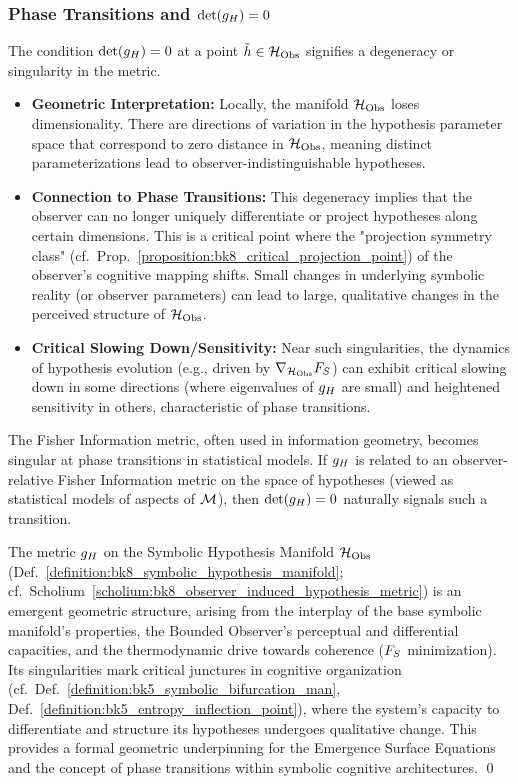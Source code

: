 \subsubsection{Phase Transitions and \(\det(g_H) = 0\)}
\label{subsec:bk8_phase_transitions}
The condition \(\det(g_H) = 0\) at a point \(\tilde{h} \in \mathcal{H}_{\mathrm{Obs}}\) signifies a degeneracy or singularity in the metric.
\begin{itemize}
    \item \textbf{Geometric Interpretation:} Locally, the manifold \(\mathcal{H}_{\mathrm{Obs}}\) loses dimensionality. There are directions of variation in the hypothesis parameter space that correspond to zero distance in \(\mathcal{H}_{\mathrm{Obs}}\), meaning distinct parameterizations lead to observer-indistinguishable hypotheses.
    \item \textbf{Connection to Phase Transitions:} This degeneracy implies that the observer can no longer uniquely differentiate or project hypotheses along certain dimensions. This is a critical point where the "projection symmetry class" (cf.~Prop.~\ref{proposition:bk8_critical_projection_point}) of the observer's cognitive mapping shifts. Small changes in underlying symbolic reality (or observer parameters) can lead to large, qualitative changes in the perceived structure of \(\mathcal{H}_{\mathrm{Obs}}\).
    \item \textbf{Critical Slowing Down/Sensitivity:} Near such singularities, the dynamics of hypothesis evolution (e.g., driven by \(\nabla_{\mathcal{H}_{\mathrm{Obs}}}F_S\)) can exhibit critical slowing down in some directions (where eigenvalues of \(g_H\) are small) and heightened sensitivity in others, characteristic of phase transitions.
\end{itemize}
The Fisher Information metric, often used in information geometry, becomes singular at phase transitions in statistical models. If \(g_H\) is related to an observer-relative Fisher Information metric on the space of hypotheses (viewed as statistical models of aspects of \(\mathcal{M}\)), then \(\det(g_H)=0\) naturally signals such a transition.
\begin{scholium}
\label{scholium:bk8_emergent_geometry_of_cognition}
The metric \(g_H\) on the Symbolic Hypothesis Manifold \(\mathcal{H}_{\mathrm{Obs}}\) (Def.~\ref{definition:bk8_symbolic_hypothesis_manifold}; cf.~Scholium~\ref{scholium:bk8_observer_induced_hypothesis_metric}) is an emergent geometric structure, arising from the interplay of the base symbolic manifold's properties, the Bounded Observer's perceptual and differential capacities, and the thermodynamic drive towards coherence (\(F_S\) minimization). Its singularities mark critical junctures in cognitive organization (cf.~Def.~\ref{definition:bk5_symbolic_bifurcation_man}, Def.~\ref{definition:bk5_entropy_inflection_point}), where the system's capacity to differentiate and structure its hypotheses undergoes qualitative change. This provides a formal geometric underpinning for the Emergence Surface Equations and the concept of phase transitions within symbolic cognitive architectures.
\qed
\end{scholium}
